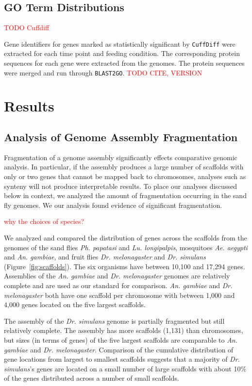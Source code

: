 \subsection{GO Term Distributions}

\textcolor{red}{TODO Cuffdiff}

Gene identifiers for genes marked as statistically significant by \texttt{CuffDiff} were extracted for each time point and feeding condition.  The corresponding protein sequences for each gene were extracted from the genomes.  The protein sequences were merged and run through \texttt{BLAST2GO}. \textcolor{red}{TODO CITE, VERSION}

\section{Results}

\subsection{Analysis of Genome Assembly Fragmentation}
Fragmentation of a genome assembly significantly effects comparative genomic analysis.  In particular, if the assembly produces a large number of scaffolds with only or two genes that cannot be mapped back to chromosomes, analyses such as synteny will not produce interpretable results.  To place our analyses discussed below in context, we analyzed the amount of fragmentation occurring in the sand fly genomes.  We our analysis found evidence of significant fragmentation.

\textcolor{red}{why the choices of species?}

We analyzed and compared the distribution of genes across the scaffolds from the genomes of the sand flies \emph{Ph. papatasi} and \emph{Lu. longipalpis}, mosquitoes \emph{Ae. aegypti} and \emph{An. gambiae}, and fruit flies \emph{Dr. melonagaster} and \emph{Dr. simulans} (Figure~\ref{fig:scaffolds}).  The six organisms have between 10,100 and 17,294 genes.  Assemblies of the \emph{An. gambiae} and \emph{Dr. melonagaster} genomes are relatively complete and are used as our standard for comparison.  \emph{An. gambiae} and \emph{Dr. melonagaster} both have one scaffold per chromosome with between 1,000 and 4,000 genes located on the five largest scaffolds.

The assembly of the \emph{Dr. simulans} genome is partially fragmented but still relatively complete.  The assembly has more scaffolds (1,131) than chromosomes, but sizes (in terms of genes) of the five largest scaffolds are comparable to \emph{An. gambiae} and \emph{Dr. melonagaster}.  Comparison of the cumulative distribution of gene locations from largest to smallest scaffolds suggests that a majority of \emph{Dr. simulans}'s genes are located on a small number of large scaffolds with about 10\% of the genes distributed across a number of small scaffolds.

